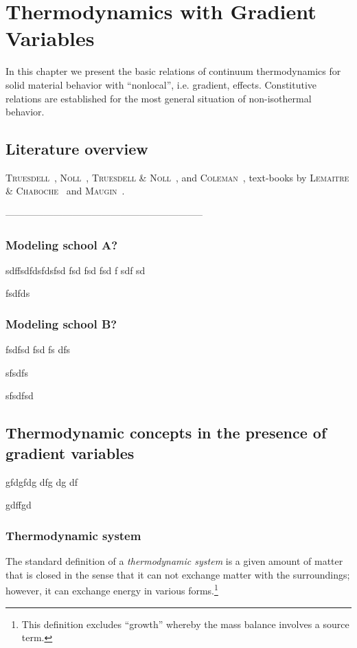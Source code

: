 
\chapter{Thermodynamics with Gradient Variables}

In this chapter we present the basic relations of continuum
thermodynamics for solid material behavior with ``nonlocal'', i.e. 
gradient, effects. Constitutive relations are established for the most 
general situation of non-isothermal behavior.

\section{Literature overview}

{\scshape Truesdell}~\cite{Truesdell1968}, {\scshape Noll}~\cite{Noll1958}, {\scshape Truesdell \&
Noll}~\cite{Truesdell1965}, and {\scshape Coleman}~\cite{Coleman1964}, text-books by {\scshape Lemaitre \&
Chaboche}~\cite{Lemaitre1990a} and {\scshape Maugin}~\cite{Maugin1992}.

--------------------------------------------------------------

\subsection{Modeling school A?}
sdffsdfdsfdsfsd
fsd
fsd
fsd
f
sdf
sd

fsdfds

\subsection{Modeling school B?}
fsdfsd
fsd
fs
dfs

sfsdfs


sfsdfsd
\section{Thermodynamic concepts in the presence of gradient variables}
gfdgfdg
dfg
dg
df

gdffgd
\subsection{Thermodynamic system}

\begin{definition}
The standard definition of a {\em thermodynamic system} is a given amount 
of matter that is closed in the sense that it can not exchange matter with the
surroundings; however, it can exchange energy in various forms.\footnote{This 
definition excludes ``growth'' whereby the mass balance involves a source term.}
\end{definition}

